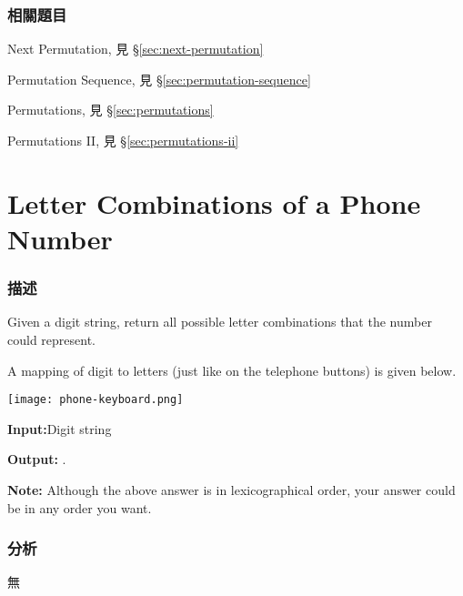 \subsubsection{相關題目}
\begindot
\item Next Permutation, 見 \S \ref{sec:next-permutation}
\item Permutation Sequence, 見 \S \ref{sec:permutation-sequence}
\item Permutations, 見 \S \ref{sec:permutations}
\item Permutations II, 見 \S \ref{sec:permutations-ii}
\myenddot


\section{Letter Combinations of a Phone Number } %
\label{sec:letter-combinations-of-a-phone-number }


\subsubsection{描述}
Given a digit string, return all possible letter combinations that the number could represent.

A mapping of digit to letters (just like on the telephone buttons) is given below.

\begin{center}
\texttt{[image: phone-keyboard.png]}\\
\label{fig:phone-keyboard}
\end{center}

\textbf{Input:}Digit string 

\textbf{Output:} \code{["ad", "ae", "af", "bd", "be", "bf", "cd", "ce", "cf"]}.

\textbf{Note:}
Although the above answer is in lexicographical order, your answer could be in any order you want.


\subsubsection{分析}
無


